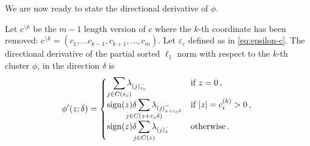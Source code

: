 We are now ready to state the directional derivative of $\phi$. %

\begin{theorem}\label{thm:sl1-directional-derivative}
  Let \(c^{\setminus k}\) be the \(m - 1\) length version of $c$ where the $k$-th coordinate has been removed: $c^{\setminus k} = (c_1, \ldots c_{k-1}, c_{k+1}, \ldots, c_m)$.
  Let \({\varepsilon_c}\) defined as in \eqref{eq:epsilon-c}.
  The directional derivative of the partial sorted $\ell_1$ norm with respect to the $k$-th cluster \(\phi\), in the direction \(\delta\) is
  \[
    \phi'(z; \delta) =
    \begin{cases}
      \smashoperator[r]{\sum_{j \in C(\varepsilon_c )}} \lambda_{(j)^-_{\varepsilon_c }}
       & \text{if } z = 0 \, ,               \\
      \sign(z)\delta\smashoperator{\sum_{j \in C(z + {\varepsilon_c} \delta)}} \lambda_{(j)^-_{z + {\varepsilon_c}\delta}}
       & \text{if } |z| = c^{(k)}_i > 0 \, , \\
      \sign(z)\delta\smashoperator{\sum_{j \in C(z)}} \lambda_{(j)^-_{z}}
       & \text{otherwise} \, .
    \end{cases}
  \]
\end{theorem}
